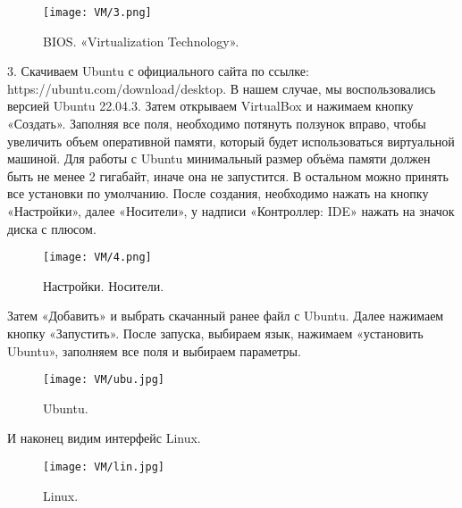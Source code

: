 \begin{figure}[h]
		\centering
		\texttt{[image: VM/3.png]}
\caption{BIOS. «Virtualization Technology».}
\label{ris:image}
\end{figure}

3. Скачиваем Ubuntu с официального сайта по ссылке: https://ubuntu.com/download/desktop. В нашем случае, мы воспользовались версией Ubuntu 22.04.3. Затем открываем VirtualBox и нажимаем кнопку «Создать». Заполняя все поля, необходимо потянуть ползунок вправо, чтобы увеличить объем оперативной памяти, который будет использоваться виртуальной машиной. Для работы с Ubuntu минимальный размер объёма памяти должен быть не менее 2 гигабайт, иначе она не запустится. В остальном можно принять все установки по умолчанию. После создания, необходимо нажать на кнопку «Настройки», далее «Носители», у надписи «Контроллер: IDE» нажать на значок диска с плюсом. 

\begin{figure}[h]
		\centering
		\texttt{[image: VM/4.png]}
\caption{Настройки. Носители.}
\label{ris:image}

\end{figure}

\quad Затем «Добавить» и выбрать скачанный ранее файл с Ubuntu. Далее нажимаем кнопку «Запустить». После запуска, выбираем язык, нажимаем «установить Ubuntu», заполняем все поля и выбираем параметры.

\begin{figure}[h]
		\centering
		\texttt{[image: VM/ubu.jpg]}
\caption{Ubuntu.}
\label{ris:image}

\end{figure}

И наконец видим интерфейс Linux.

\begin{figure}[h]
		\centering
		\texttt{[image: VM/lin.jpg]}
\caption{Linux.}
\label{ris:image}

\end{figure}


